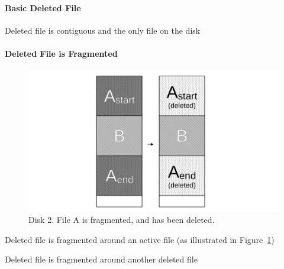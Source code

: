 \paragraph{Basic Deleted File}
\begin{arabiclist}
    \item Deleted file is contiguous and the only file on the disk
\end{arabiclist}
\paragraph{Deleted File is Fragmented}
\begin{arabiclist}[2]
\setcounter{enumi}{1}
    \begin{figure}
        \centering
        \includegraphics[width=\linewidth]{fig/case2.pdf}
        \caption{Disk 2. File A is fragmented, and has been deleted.}
        \label{fig:case2}
    \end{figure}
    \item Deleted file is fragmented around an active file (as illustrated in Figure~\ref{fig:case2})
    \item Deleted file is fragmented around another deleted file
\end{arabiclist}
